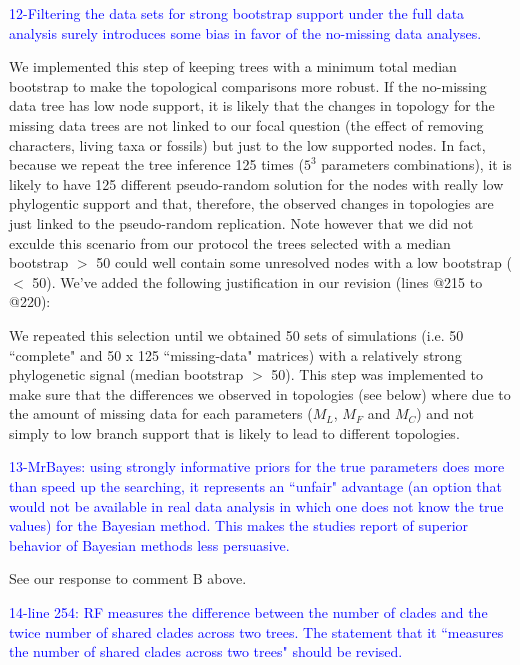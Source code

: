 \documentclass[11pt]{letter}
\begin{document}
\begin{letter}{}
\textcolor{blue}{12-Filtering the data sets for strong bootstrap support under the full data analysis surely introduces some bias in favor of the no-missing data analyses.}

We implemented this step of keeping trees with a minimum total median bootstrap to make the topological comparisons more robust. If the no-missing data tree has low node support, it is likely that the changes in topology for the missing data trees are not linked to our focal question (the effect of removing characters, living taxa or fossils) but just to the low supported nodes. In fact, because we repeat the tree inference 125 times ($5^3$ parameters combinations), it is likely to have 125 different pseudo-random solution for the nodes with really low phylogentic support and that, therefore, the observed changes in topologies are just linked to the pseudo-random replication. Note however that we did not exculde this scenario from our protocol the trees selected with a median bootstrap $>$ 50 could well contain some unresolved nodes with a low bootstrap ($<$ 50). We've added the following justification in our revision (lines @215 to @220):

\hfill\begin{minipage}{\dimexpr\textwidth-1cm}
We repeated this selection until we obtained 50 sets of simulations (i.e. 50 ``complete" and 50 x 125 ``missing-data" matrices) with a relatively strong phylogenetic signal (median bootstrap $>$ 50). This step was implemented to make sure that the differences we observed in topologies (see below) where due to the amount of missing data for each parameters ($M_L$, $M_F$ and $M_C$) and not simply to low branch support that is likely to lead to different topologies.
\end{minipage}


\textcolor{blue}{13-MrBayes: using strongly informative priors for the true parameters does more than speed up the searching, it represents an ``unfair" advantage (an option that would not be available in real data analysis in which one does not know the true values) for the Bayesian method. This makes the studies report of superior behavior of Bayesian methods less persuasive.}

See our response to comment B above.


\textcolor{blue}{14-line 254: RF measures the difference between the number of clades and the twice number of shared clades across two trees. The statement that it ``measures the number of shared clades across two trees" should be revised.}


\end{letter}
\end{document}
